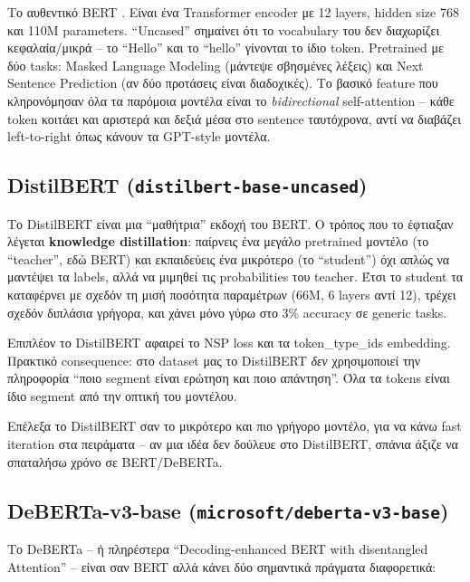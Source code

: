 \documentclass[12pt]{fphw}
\begin{document}
Το αυθεντικό BERT \cite{devlin2019bert}. Είναι ένα Transformer encoder με 12 layers, hidden size 768 και 110M parameters. ``Uncased'' σημαίνει ότι το vocabulary του δεν διαχωρίζει κεφαλαία/μικρά -- το ``Hello'' και το ``hello'' γίνονται το ίδιο token. Pretrained με δύο tasks: Masked Language Modeling (μάντεψε σβησμένες λέξεις) και Next Sentence Prediction (αν δύο προτάσεις είναι διαδοχικές). Το βασικό feature που κληρονόμησαν όλα τα παρόμοια μοντέλα είναι το \emph{bidirectional} self-attention -- κάθε token κοιτάει και αριστερά και δεξιά μέσα στο sentence ταυτόχρονα, αντί να διαβάζει left-to-right όπως κάνουν τα GPT-style μοντέλα.

\subsection{DistilBERT (\texttt{distilbert-base-uncased})}

Το DistilBERT \cite{sanh2019distilbert} είναι μια ``μαθήτρια'' εκδοχή του BERT. Ο τρόπος που το έφτιαξαν λέγεται \textbf{knowledge distillation}: παίρνεις ένα μεγάλο pretrained μοντέλο (το ``teacher'', εδώ BERT) και εκπαιδεύεις ένα μικρότερο (το ``student'') όχι απλώς να μαντέψει τα labels, αλλά να μιμηθεί τις probabilities του teacher. Έτσι το student τα καταφέρνει με σχεδόν τη μισή ποσότητα παραμέτρων (66M, 6 layers αντί 12), τρέχει σχεδόν διπλάσια γρήγορα, και χάνει μόνο γύρω στο 3\% accuracy σε generic tasks.

Επιπλέον το DistilBERT αφαιρεί το NSP loss και τα token\_type\_ids embedding. Πρακτικό consequence: στο dataset μας το DistilBERT \emph{δεν} χρησιμοποιεί την πληροφορία ``ποιο segment είναι ερώτηση και ποιο απάντηση''. Όλα τα tokens είναι ίδιο segment από την οπτική του μοντέλου.

Επέλεξα το DistilBERT σαν το μικρότερο και πιο γρήγορο μοντέλο, για να κάνω fast iteration στα πειράματα -- αν μια ιδέα δεν δούλευε στο DistilBERT, σπάνια άξιζε να σπαταλήσω χρόνο σε BERT/DeBERTa.

\subsection{DeBERTa-v3-base (\texttt{microsoft/deberta-v3-base})}

Το DeBERTa \cite{he2021deberta} -- ή πληρέστερα ``Decoding-enhanced BERT with disentangled Attention'' -- είναι σαν BERT αλλά κάνει δύο σημαντικά πράγματα διαφορετικά:
\end{document}
